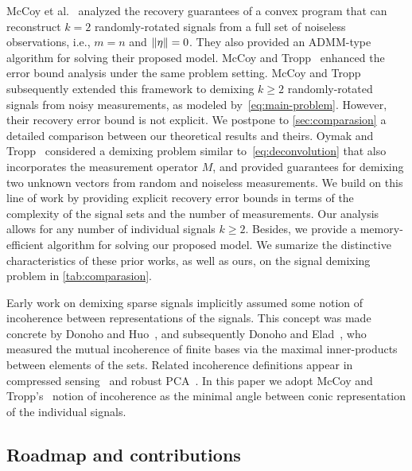 McCoy et al.~\cite{mccoy2014convexity} analyzed the recovery guarantees of a convex program that can reconstruct $k = 2$ randomly-rotated signals from a full set of noiseless observations, i.e., $m=n$ and $\|\eta\|=0$. They also provided an ADMM-type algorithm for solving their proposed model. McCoy and Tropp~\cite{mccoy2014sharp} enhanced the error bound analysis under the same problem setting. McCoy and Tropp~\cite{mccoy2013achievable} subsequently extended this framework to demixing $k \geq 2$ randomly-rotated signals from noisy measurements, as modeled by~\eqref{eq:main-problem}. However, their recovery error bound is not explicit. We postpone to \autoref{sec:comparasion} a detailed comparison between our theoretical results and theirs. Oymak and Tropp~\cite{oymak2017universality} considered a demixing problem similar to~\eqref{eq:deconvolution} that also incorporates the measurement operator $M$, and provided guarantees for demixing two unknown vectors from random and noiseless measurements. We build on this line of work by providing explicit recovery error bounds in terms of the complexity of the signal sets and the number of measurements. Our analysis allows for any number of individual signals $k\ge2$. Besides, we provide a memory-efficient algorithm for solving our proposed model. We sumarize the distinctive characteristics of these prior works, as well as ours, on the signal demixing problem in \autoref{tab:comparasion}.

Early work on demixing sparse signals implicitly assumed some notion of incoherence between representations of the signals. This concept was made concrete by Donoho and Huo~\cite{doh01}, and subsequently Donoho and Elad~\cite{doe03}, who measured the mutual incoherence of finite bases via the maximal inner-products between elements of the sets. Related incoherence definitions appear in compressed sensing~\cite{tro04, maleki2009coherence} and robust PCA~\cite{candes2011robust, wright2013compressive}. In this paper we adopt McCoy and Tropp's~\cite{mccoy2013achievable} notion of incoherence as the minimal angle between conic representation of the individual signals.

\subsection{Roadmap and contributions}

